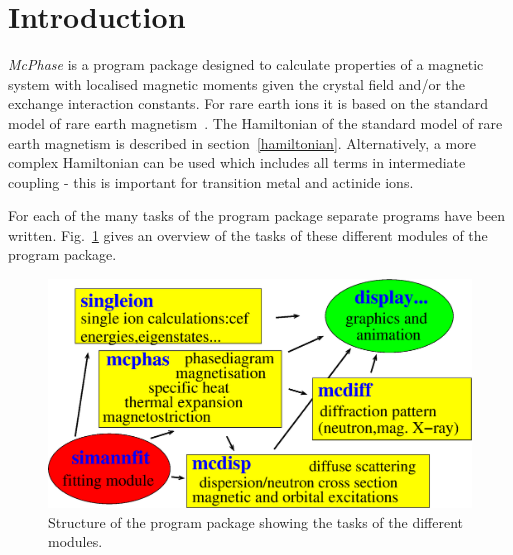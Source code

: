 \documentclass[twoside]{article}
\newcommand{\prg}{\sl}
\begin{document}
\clearpage
\section{Introduction}

{\prg McPhase} is a program package designed to calculate 
properties of a magnetic system with localised magnetic moments
given the crystal field and/or the
exchange interaction constants.
For rare earth ions it is based on the standard model
of rare earth magnetism~\cite{jensen91-1}.
The Hamiltonian of the standard model of rare earth magnetism 
is described in section~\ref{hamiltonian}.
Alternatively, a more complex Hamiltonian can be used which includes
all terms in intermediate coupling - this is important for transition metal
and actinide ions.

 

For each of the many tasks of the program package separate programs have been written.
Fig.~\ref{modules} gives an overview of the 
tasks of these different modules of the program package.


\begin{figure}[hb]\begin{center}
\includegraphics[angle=0,width=0.7\columnwidth]{figsrc/mcphas_modules.eps}
\caption{\label{modules}
Structure of the program package showing the tasks of the different modules.}
\end{center}
\end{figure}
\end{document}
